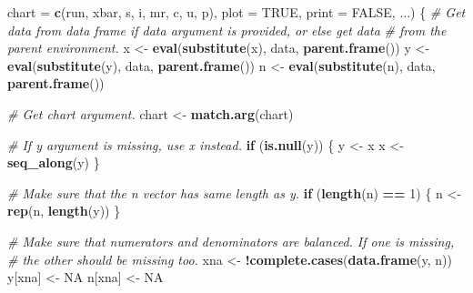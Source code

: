 \documentclass[
]{book}
\newenvironment{Shaded}{\begin{snugshade}}{\end{snugshade}}
\newcommand{\AttributeTok}[1]{\textcolor[rgb]{0.13,0.29,0.53}{#1}}
\newcommand{\CommentTok}[1]{\textcolor[rgb]{0.56,0.35,0.01}{\textit{#1}}}
\newcommand{\ConstantTok}[1]{\textcolor[rgb]{0.56,0.35,0.01}{#1}}
\newcommand{\ControlFlowTok}[1]{\textcolor[rgb]{0.13,0.29,0.53}{\textbf{#1}}}
\newcommand{\DecValTok}[1]{\textcolor[rgb]{0.00,0.00,0.81}{#1}}
\newcommand{\FunctionTok}[1]{\textcolor[rgb]{0.13,0.29,0.53}{\textbf{#1}}}
\newcommand{\NormalTok}[1]{#1}
\newcommand{\OtherTok}[1]{\textcolor[rgb]{0.56,0.35,0.01}{#1}}
\newcommand{\SpecialCharTok}[1]{\textcolor[rgb]{0.81,0.36,0.00}{\textbf{#1}}}
\newcommand{\StringTok}[1]{\textcolor[rgb]{0.31,0.60,0.02}{#1}}
\begin{document}
\begin{Shaded}
\begin{Highlighting}[]
                \AttributeTok{chart    =} \FunctionTok{c}\NormalTok{(}\StringTok{\textquotesingle{}run\textquotesingle{}}\NormalTok{, }\StringTok{\textquotesingle{}xbar\textquotesingle{}}\NormalTok{, }\StringTok{\textquotesingle{}s\textquotesingle{}}\NormalTok{, }\StringTok{\textquotesingle{}i\textquotesingle{}}\NormalTok{, }\StringTok{\textquotesingle{}mr\textquotesingle{}}\NormalTok{, }\StringTok{\textquotesingle{}c\textquotesingle{}}\NormalTok{, }\StringTok{\textquotesingle{}u\textquotesingle{}}\NormalTok{, }\StringTok{\textquotesingle{}p\textquotesingle{}}\NormalTok{),}
                \AttributeTok{plot     =} \ConstantTok{TRUE}\NormalTok{,}
                \AttributeTok{print    =} \ConstantTok{FALSE}\NormalTok{,}
\NormalTok{                ...) \{}
  \CommentTok{\# Get data from data frame if data argument is provided, or else get data}
  \CommentTok{\# from the parent environment.}
\NormalTok{  x      }\OtherTok{\textless{}{-}} \FunctionTok{eval}\NormalTok{(}\FunctionTok{substitute}\NormalTok{(x), data, }\FunctionTok{parent.frame}\NormalTok{())}
\NormalTok{  y      }\OtherTok{\textless{}{-}} \FunctionTok{eval}\NormalTok{(}\FunctionTok{substitute}\NormalTok{(y), data, }\FunctionTok{parent.frame}\NormalTok{())}
\NormalTok{  n      }\OtherTok{\textless{}{-}} \FunctionTok{eval}\NormalTok{(}\FunctionTok{substitute}\NormalTok{(n), data, }\FunctionTok{parent.frame}\NormalTok{())}
  
  \CommentTok{\# Get chart argument.}
\NormalTok{  chart  }\OtherTok{\textless{}{-}} \FunctionTok{match.arg}\NormalTok{(chart)}
  
  \CommentTok{\# If y argument is missing, use x instead.}
  \ControlFlowTok{if}\NormalTok{ (}\FunctionTok{is.null}\NormalTok{(y)) \{}
\NormalTok{    y }\OtherTok{\textless{}{-}}\NormalTok{ x}
\NormalTok{    x }\OtherTok{\textless{}{-}} \FunctionTok{seq\_along}\NormalTok{(y)}
\NormalTok{  \}}
  
  \CommentTok{\# Make sure that the n vector has same length as y.}
  \ControlFlowTok{if}\NormalTok{ (}\FunctionTok{length}\NormalTok{(n) }\SpecialCharTok{==} \DecValTok{1}\NormalTok{) \{}
\NormalTok{    n }\OtherTok{\textless{}{-}} \FunctionTok{rep}\NormalTok{(n, }\FunctionTok{length}\NormalTok{(y))}
\NormalTok{  \}}
  
  \CommentTok{\# Make sure that numerators and denominators are balanced. If one is missing,}
  \CommentTok{\# the other should be missing too.}
\NormalTok{  xna    }\OtherTok{\textless{}{-}} \SpecialCharTok{!}\FunctionTok{complete.cases}\NormalTok{(}\FunctionTok{data.frame}\NormalTok{(y, n))}
\NormalTok{  y[xna] }\OtherTok{\textless{}{-}} \ConstantTok{NA}
\NormalTok{  n[xna] }\OtherTok{\textless{}{-}} \ConstantTok{NA}
  

\end{Highlighting}
\end{Shaded}
\end{document}
